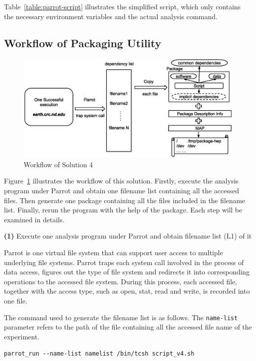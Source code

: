 \documentclass{acm_proc_article-sp}
\begin{document}
Table~\ref{table:parrot-script} illustrates
the simplified script, which
only contains the necessary environment variables and the
actual analysis command.

\subsection{Workflow of Packaging Utility}
\begin{figure}
\centering
\includegraphics[width=1.6\columnwidth]{workflow-parrot.eps}
\caption{Workflow of Solution 4}
\label{fig:workflow-parrot}
\end{figure}

Figure~\ref{fig:workflow-parrot} illustrates the workflow of this solution. Firstly, execute the analysis program under Parrot and obtain one filename list containing all the accessed files. Then generate one package containing all the files included in the filename list. Finally, rerun the program with the help of the package. Each step will be examined in details.

{\bf(1)} Execute one analysis program under Parrot and obtain filename list (L1) of it

Parrot is one virtual file system that can support user access to multiple
underlying file systems. Parrot traps each system call involved in the process
of data access, figures out the type of file system and redirects it into
corresponding operations to the accessed file system. During this process, each
accessed file, together with the access type, such as
open, stat, read and write, is recorded into one file.

The command used to generate the filename list is as follows. The {\tt name-list} parameter refers to the path of the file containing all the accessed file name of the experiment.

{\tt parrot\_run \texttt{-{}-}name-list namelist /bin/tcsh script\_v4.sh}
\end{document}
